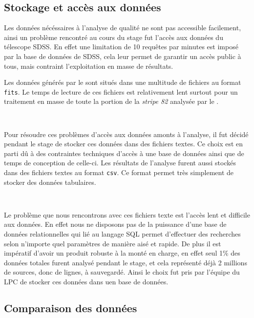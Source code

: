 	\subsection{Stockage et accès aux données}

Les données nécéssaires à l'analyse de qualité ne sont pas accessible facilement, ainsi un problème rencontré au cours du stage fut l'accès aux données du télescope SDSS. En effet une limitation de 10 requêtes par minutes est imposé par la base de données de SDSS, cela leur permet de garantir un accès public à tous, mais contraint l'exploitation en masse de résultats.

Les données générés par le \stack{} sont situés dans une multitude de fichiers au format \texttt{fits}. Le temps de lecture de ces fichiers est relativement lent surtout pour un traitement en masse de toute la portion de la \emph{stripe 82} analysée par le \CC.{}

\ 

Pour résoudre ces problèmes d'accès aux données amonts à l'analyse, il fut décidé pendant le stage de stocker ces données dans des fichiers textes. Ce choix est en parti dû à des contraintes techniques d'accès à une base de données ainsi que de temps de conception de celle-ci. Les résultats de l'analyse furent aussi stockés dans des fichiers textes au format \texttt{csv}. Ce format permet très simplement de stocker des données tabulaires.

\ 

Le problème que nous rencontrons avec ces fichiers texte est l'accès lent et difficile aux données. En effet nous ne disposons pas de la puissance d'une base de données relationnelles qui lié au langage SQL permet d'effectuer des recherches selon n'importe quel paramètres de manière aisé et rapide. De plus il est impératif d'avoir un produit robuste à la monté en charge, en effet seul 1\% des données totales furent analysé pendant le stage, et cela représenté déjà 2 millions de sources, donc de lignes, à sauvegardé. Ainsi le choix fut pris par l'équipe du LPC de stocker ces données dans uen base de données.


	\subsection{Comparaison des données}

